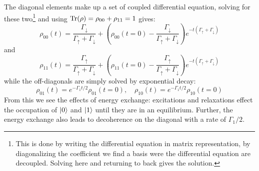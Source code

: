 The diagonal elements make up a set of coupled differential equation, solving for these two\footnote{This is done by writing the differential equation in matrix representation, by diagonalizing the coefficient we find a basis were the differential equation are decoupled. Solving here and returning to back gives the solution. }  and using $\Tr(\rho) = \rho_{00} + \rho_{11} = 1$ gives:
\begin{equation}
\rho_{00}(t) = \frac{\Gamma_\downarrow}{\Gamma_\uparrow + \Gamma_\downarrow} + \left(\rho_{00}(t=0) -  \frac{\Gamma_\downarrow}{\Gamma_\uparrow + \Gamma_\downarrow}\right)e^{-t(\Gamma_\uparrow + \Gamma_\downarrow)}
\end{equation}
and 
\begin{equation}    
\rho_{11}(t) = \frac{\Gamma_\uparrow}{\Gamma_\uparrow + \Gamma_\downarrow}+\left( \rho_{11}(t=0) -\frac{ \Gamma_\uparrow}{\Gamma_\uparrow + \Gamma_\downarrow}\right) e^{-t(\Gamma_\uparrow + \Gamma_\downarrow)}
\end{equation}
while the off-diagonals are simply solved by exponential decay:
\begin{equation}
    \rho_{01}(t) = e^{-\Gamma_1 t/2}\rho_{01}(t=0), \quad \rho_{10}(t) = e^{-\Gamma_1 t/2}\rho_{10}(t=0)
\end{equation}
From this we see the effects of energy exchange: excitations and relaxations effect the occupation of $\ket{0}$ and $\ket{1}$ until they are in an equilibrium. Further, the energy exchange also leads to decoherence on the diagonal with a rate of $\Gamma_1/2$. 
